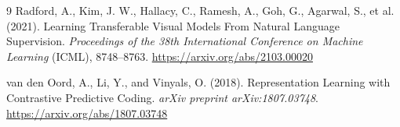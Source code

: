 \documentclass[12pt]{article}
\begin{document}
\begin{thebibliography}{9}
Radford, A., Kim, J. W., Hallacy, C., Ramesh, A., Goh, G., Agarwal, S., et al. (2021).
Learning Transferable Visual Models From Natural Language Supervision.
\textit{Proceedings of the 38th International Conference on Machine Learning} (ICML), 8748--8763.
\url{https://arxiv.org/abs/2103.00020}

van den Oord, A., Li, Y., and Vinyals, O. (2018).
Representation Learning with Contrastive Predictive Coding.
\textit{arXiv preprint arXiv:1807.03748}.
\url{https://arxiv.org/abs/1807.03748}

\end{thebibliography}
\end{document}
